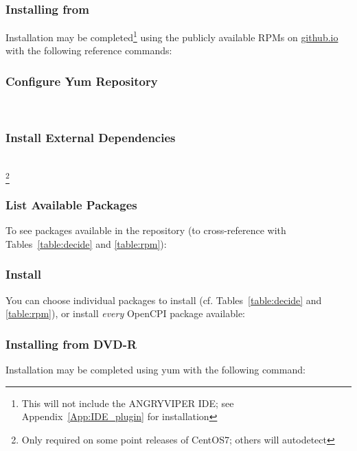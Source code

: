 \subsubsection{Installing from }
Installation may be completed\footnote{This will not include the ANGRYVIPER IDE; see Appendix~\ref{App:IDE_plugin} for installation} using the publicly available RPMs on \href{https://opencpi.github.io/}{github.io} with the following reference commands:
\subsubsection*{Configure Yum Repository}
\\

\subsubsection*{Install External Dependencies}
\\
\footnote{Only required on some point releases of CentOS7; others will autodetect} %

\subsubsection*{List Available Packages}
To see packages available in the repository (to cross-reference with Tables~\ref{table:decide} and \ref{table:rpm}):\\

\subsubsection*{Install}
You can choose individual packages to install (cf. Tables~\ref{table:decide} and \ref{table:rpm}), or install \textit{every} OpenCPI package available:\\

\subsubsection{Installing from DVD-R}
Installation may be completed using yum with the following command:\\

